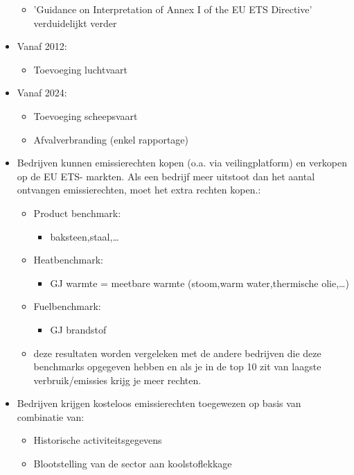 \documentclass[12pt]{article}
\begin{document}
\begin{itemize}
\begin{itemize}
        \item 'Guidance on Interpretation of Annex I of the EU ETS Directive' verduidelijkt verder
    \end{itemize}
    \item Vanaf 2012:\begin{itemize}
        \item Toevoeging luchtvaart 
    \end{itemize}
    \item Vanaf 2024:\begin{itemize}
        \item Toevoeging scheepsvaart
        \item Afvalverbranding (enkel rapportage)
    \end{itemize}
    \item Bedrijven kunnen emissierechten kopen (o.a. via veilingplatform) en verkopen op de EU ETS-
    markten. Als een bedrijf meer uitstoot dan het aantal ontvangen emissierechten, moet het extra
    rechten kopen.:\begin{itemize}
        \item Product benchmark:\begin{itemize}
            \item baksteen,staal,\dots
        \end{itemize}
        \item Heatbenchmark:\begin{itemize}
            \item GJ warmte = meetbare warmte (stoom,warm water,thermische olie,\dots)
        \end{itemize}
        \item Fuelbenchmark:\begin{itemize}
            \item GJ brandstof
        \end{itemize}
        \item deze resultaten worden vergeleken met de andere bedrijven die deze benchmarks opgegeven hebben en als je in de top 10 zit van laagste verbruik/emissies krijg je meer rechten.
    \end{itemize}
    \item Bedrijven krijgen kosteloos emissierechten toegewezen op basis van combinatie van:\begin{itemize}
        \item Historische activiteitsgegevens 
        \item Blootstelling van de sector aan koolstoflekkage 

\end{itemize}
\end{itemize}
\end{document}
